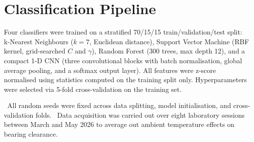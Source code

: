 \section{Classification Pipeline}
Four classifiers were trained on a stratified 70/15/15 train/validation/test split: k-Nearest
Neighbours ($k=7$, Euclidean distance), Support Vector Machine (RBF kernel, grid-searched $C$
and $\gamma$), Random Forest (300 trees, max depth 12), and a compact 1-D CNN (three
convolutional blocks with batch normalisation, global average pooling, and a softmax output
layer). All features were z-score normalised using statistics computed on the training split
only. Hyperparameters were selected via 5-fold cross-validation on the training set.

\begin{tcolorbox}[notebox,title={Reproducibility Note}]
\faFile\ All random seeds were fixed across data splitting, model initialisation, and
cross-validation folds. \faCalendar\ Data acquisition was carried out over eight laboratory
sessions between March and May 2026 to average out ambient temperature effects on bearing
clearance.
\end{tcolorbox}

